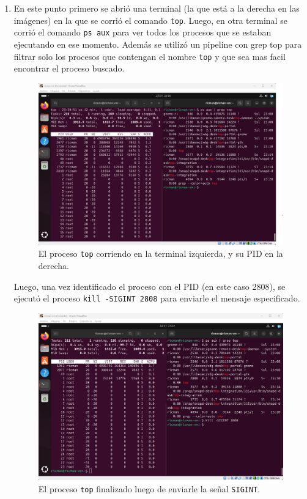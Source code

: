 \documentclass[12pt]{article}
\begin{document}
\begin{enumerate}[1.]
      \item En este punto primero se abrió una terminal (la que está a la derecha en las imágenes) en la que se corrió el comando \verb|top|. Luego, en otra terminal se corrió el comando \verb|ps aux| para ver todos los procesos que se estaban ejecutando en ese momento. Además se utilizó un pipeline con grep top para filtrar solo los procesos que contengan el nombre \verb|top| y que sea mas facil encontrar el proceso buscado. 
	\begin{figure}[H]
	  \centering
	  \includegraphics[width=\linewidth]{../imagenes/top-corriendo.png}
	  \caption{El proceso \texttt{top} corriendo en la terminal izquierda, y su PID en la derecha.}
	  \label{}
	\end{figure}

	Luego, una vez identificado el proceso con el PID (en este caso 2808), se ejecutó el proceso \verb|kill -SIGINT 2808| para enviarle el mensaje especificado.
	\begin{figure}[H]
	  \centering
	  \includegraphics[width=\linewidth]{../imagenes/top-despues-de-parar.png}
	  \caption{El proceso \texttt{top} finalizado luego de enviarle la señal \texttt{SIGINT}.}
	  \label{}
	\end{figure}


\end{enumerate}
\end{document}
